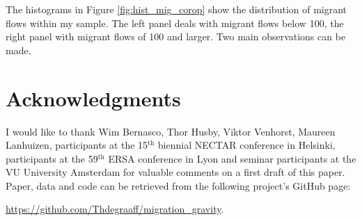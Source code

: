 \documentclass[fleqn,10pt]{SelfArx} %
\begin{document}
The histograms in Figure \ref{fig:hist_mig_corop} show the distribution of
migrant flows within my sample. The left panel deals with migrant flows below
100, the right panel with migrant flows of 100 and larger. Two main observations
can be made.

\section*{Acknowledgments}

I would like to thank Wim Bernasco, Thor Husby, Viktor Venhorst, Maureen
Lanhuizen, participants at the 15$^{\text{th}}$ biennial NECTAR conference in
Helsinki, participants at the 59$^{\text{th}}$ ERSA conference in Lyon and
seminar participants at the VU University Amsterdam for valuable comments on a
first draft of this paper. Paper, data and code can be retrieved from the
following project's GitHub page:

\href{https://github.com/Thdegraaff/migration_gravity}{https://github.com/Thdegraaff/migration\_gravity}.


\printbibliography

\end{document}
